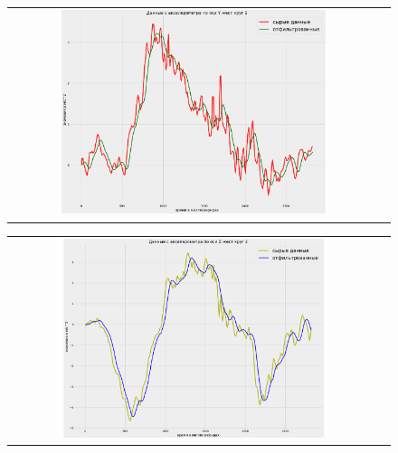 \begin{figure}[H]
    \begin{center}
        \begin{tabular}{cc}
            \includegraphics[width=0.75\textwidth]{farim/ciryres.png} & 
        \end{tabular}
    \end{center}
\end{figure}


\begin{figure}[H]
    \begin{center}
        \begin{tabular}{cc}
            \includegraphics[width=0.75\textwidth]{farim/cirzres.png} & 
        \end{tabular}
    \end{center}
\end{figure}

